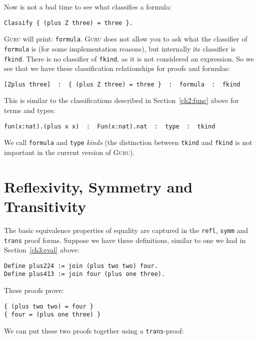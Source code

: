 \documentclass{book}[12pt]
\newcommand{\guru}[0]{\textsc{Guru}\xspace}
\begin{document}
Now is not a bad time to see what classifies a formula:

\begin{verbatim}
Classify { (plus Z three) = three }.
\end{verbatim}

\noindent \guru will print: \texttt{formula}.  \guru does not allow
you to ask what the classifier of \texttt{formula} is (for some
implementation reasons), but internally its classifier is
\texttt{fkind}.  There is no classifier of \texttt{fkind}, as it is
not considered an expression.  So we see that we have these
classification relationships for proofs and formulas:

\begin{verbatim}
[Zplus three]  :  { (plus Z three) = three }  :  formula  :  fkind
\end{verbatim} 

\noindent This is similar to the classifications described in
Section~\ref{ch2:func} above for terms and types:

\begin{verbatim}
fun(x:nat).(plus x x)  :  Fun(x:nat).nat  :  type  :  tkind
\end{verbatim} 

 \noindent We call \texttt{formula} and \texttt{type} \emph{kinds}
(the distinction between \texttt{tkind} and \texttt{fkind} is not
important in the current version of \guru).  

\section{Reflexivity, Symmetry and Transitivity}
\label{ch3:equiv}

The basic equivalence properties of equality are captured in the
\texttt{refl}, \texttt{symm} and \texttt{trans} proof forms.  Suppose
we have these definitions, similar to one we had in
Section~\ref{ch3:eval} above:

\begin{verbatim}
Define plus224 := join (plus two two) four.
Define plus413 := join four (plus one three).
\end{verbatim}

\noindent These proofs prove:

\begin{verbatim}
{ (plus two two) = four }
{ four = (plus one three) }
\end{verbatim}

\noindent We can put these two proofs together using a \texttt{trans}-proof:
\end{document}
